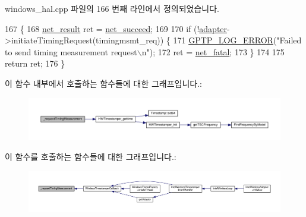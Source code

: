 windows\+\_\+hal.\+cpp 파일의 166 번째 라인에서 정의되었습니다.


\begin{DoxyCode}
167 \{
168     \hyperlink{avbts__osnet_8hpp_a21b2b4b5e479ef3adfc039ac30c961cd}{net\_result} ret = \hyperlink{avbts__osnet_8hpp_a21b2b4b5e479ef3adfc039ac30c961cda349eff10b7ad8aef2477575f9306e579}{net\_succeed};
169 
170     \textcolor{keywordflow}{if} (!\hyperlink{structadapter}{adapter}->initiateTimingRequest(timingmsmt\_req)) \{
171         \hyperlink{gptp__log_8hpp_afefbb1009717c128012bfeed94842987}{GPTP\_LOG\_ERROR}(\textcolor{stringliteral}{"Failed to send timing measurement request\(\backslash\)n"});
172         ret = \hyperlink{avbts__osnet_8hpp_a21b2b4b5e479ef3adfc039ac30c961cda2ab09e0547baba0a6c07a8d53e1529a5}{net\_fatal};
173     \}
174 
175     \textcolor{keywordflow}{return} ret;
176 \}
\end{DoxyCode}


이 함수 내부에서 호출하는 함수들에 대한 그래프입니다.\+:
\nopagebreak
\begin{figure}[H]
\begin{center}
\leavevmode
\includegraphics[width=350pt]{class_windows_wireless_timestamper_a6cc81170600e07ccfd979dba533d8539_cgraph}
\end{center}
\end{figure}




이 함수를 호출하는 함수들에 대한 그래프입니다.\+:
\nopagebreak
\begin{figure}[H]
\begin{center}
\leavevmode
\includegraphics[width=350pt]{class_windows_wireless_timestamper_a6cc81170600e07ccfd979dba533d8539_icgraph}
\end{center}
\end{figure}



